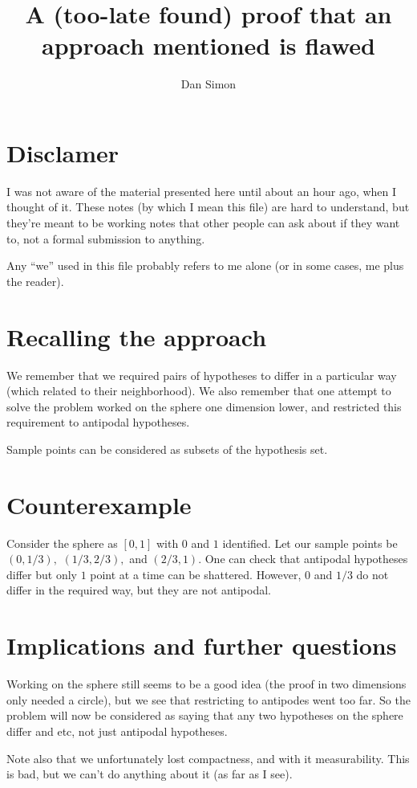 \documentclass[12pt]{amsart}
\title[Not sure what to put here]
{A (too-late found) proof that an approach mentioned is flawed}
\author{Dan Simon}
\newcommand{\0}{\mat{0}}
\newcommand{\1}{\mathds{1}}
\begin{document}
\maketitle

\section{Disclamer}

I was not aware of the material presented here until about an hour ago, when I thought of it. These notes (by which I mean this file) are hard to understand, but they're meant to be working notes that other people can ask about if they want to, not a formal submission to anything.

Any ``we'' used in this file probably refers to me alone (or in some cases, me plus the reader).

\section{Recalling the approach}

We remember that we required pairs of hypotheses to differ in a particular way (which related to their neighborhood). We also remember that one attempt to solve the problem worked on the sphere one dimension lower, and restricted this requirement to antipodal hypotheses.

Sample points can be considered as subsets of the hypothesis set.

\section{Counterexample}

Consider the sphere as $[0, 1]$ with $0$ and $1$ identified. Let our sample points be $(0, 1 / 3),$ $(1 / 3, 2 / 3),$ and $(2 / 3, 1).$ One can check that antipodal hypotheses differ but only $1$ point at a time can be shattered. However, $0$ and $1 / 3$ do not differ in the required way, but they are not antipodal.

\section{Implications and further questions}

Working on the sphere still seems to be a good idea (the proof in two dimensions only needed a circle), but we see that restricting to antipodes went too far. So the problem will now be considered as saying that any two hypotheses on the sphere differ and etc, not just antipodal hypotheses.

Note also that we unfortunately lost compactness, and with it measurability. This is bad, but we can't do anything about it (as far as I see).

 

\end{document}

